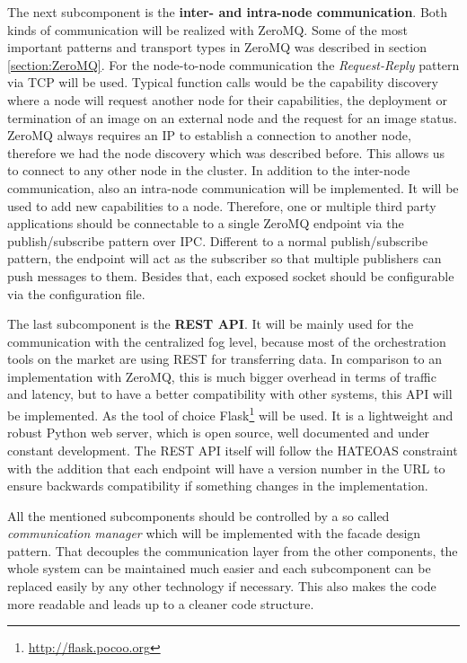 The next subcomponent is the \textbf{inter- and intra-node communication}.
Both kinds of communication will be realized with ZeroMQ.
Some of the most important patterns and transport types in ZeroMQ was described in section \ref{section:ZeroMQ}.
For the node-to-node communication the \textit{Request-Reply} pattern via \ac{TCP} will be used.
Typical function calls would be the capability discovery where a node will request another node for their capabilities, the deployment or termination of an image on an external node and the request for an image status.
ZeroMQ always requires an \ac{IP} to establish a connection to another node, therefore we had the node discovery which was described before.
This allows us to connect to any other node in the cluster.
In addition to the inter-node communication, also an intra-node communication will be implemented.
It will be used to add new capabilities to a node.
Therefore, one or multiple third party applications should be connectable to a single ZeroMQ endpoint via the publish/subscribe pattern over \ac{IPC}.
Different to a normal publish/subscribe pattern, the endpoint will act as the subscriber so that multiple publishers can push messages to them.
Besides that, each exposed socket should be configurable via the configuration file.

The last subcomponent is the \textbf{\ac{REST} \ac{API}}.
It will be mainly used for the communication with the centralized fog level, because most of the orchestration tools on the market are using \ac{REST} for transferring data.
In comparison to an implementation with ZeroMQ, this is much bigger overhead in terms of traffic and latency, but to have a better compatibility with other systems, this \ac{API} will be implemented.
As the tool of choice Flask\footnote{\url{http://flask.pocoo.org}} will be used.
It is a lightweight and robust Python web server, which is open source, well documented and under constant development.
The \ac{REST} \ac{API} itself will follow the \ac{HATEOAS} constraint with the addition that each endpoint will have a version number in the \ac{URL} to ensure backwards compatibility if something changes in the implementation.

All the mentioned subcomponents should be controlled by a so called \textit{communication manager} which will be implemented with the facade design pattern.
That decouples the communication layer from the other components, the whole system can be maintained much easier and each subcomponent can be replaced easily by any other technology if necessary.
This also makes the code more readable and leads up to a cleaner code structure.



